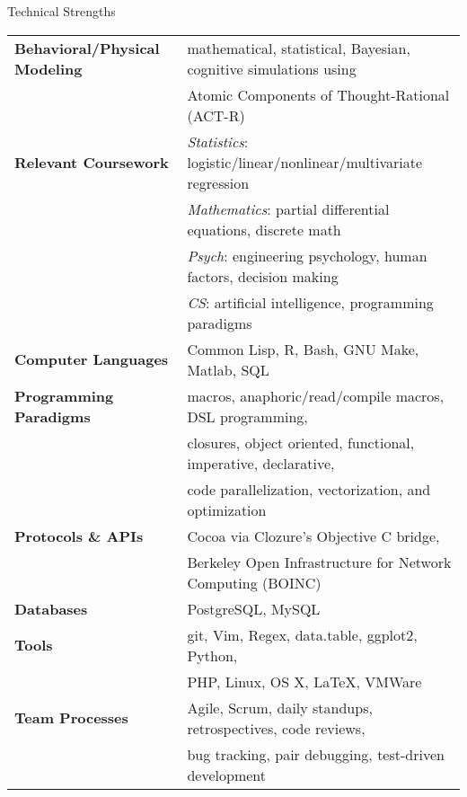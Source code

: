 

\begin{rSection}{Technical Strengths}
  \begin{tabular}{ @{} >{\bfseries}l @{\hspace{4ex}} l }
    Behavioral/Physical Modeling &	mathematical, statistical, Bayesian, cognitive simulations using \\
    &					Atomic Components of Thought-Rational (ACT-R) \\
    [.13cm]
    Relevant Coursework &		\emph{Statistics}: logistic/linear/nonlinear/multivariate regression \\
    &					\emph{Mathematics}: partial differential equations, discrete math \\
    &					\emph{Psych}: engineering psychology, human factors, decision making \\ 
    &					\emph{CS}: artificial intelligence, programming paradigms \\
    [.13cm]
    Computer Languages &		Common Lisp, R, Bash, GNU Make, Matlab, SQL \\
    [.13cm]
    Programming Paradigms &		macros, anaphoric/read/compile macros, DSL programming, \\
    & 					closures, object oriented, functional, imperative, declarative, \\
    &					code parallelization, vectorization, and optimization \\
    [.13cm]
    Protocols \& APIs & 		Cocoa via Clozure's Objective C bridge, \\
    &					Berkeley Open Infrastructure for Network Computing (BOINC) \\
    [.13cm]
    Databases &				PostgreSQL, MySQL \\
    [.13cm]
    Tools & 				git, Vim, Regex, data.table, ggplot2, Python, \\
    &					PHP, Linux, OS X, \LaTeX, VMWare\\
    [.13cm]
    Team Processes & 			Agile, Scrum, daily standups, retrospectives, code reviews, \\
    & 					bug tracking, pair debugging, test-driven development \\
  \end{tabular}
\end{rSection}

